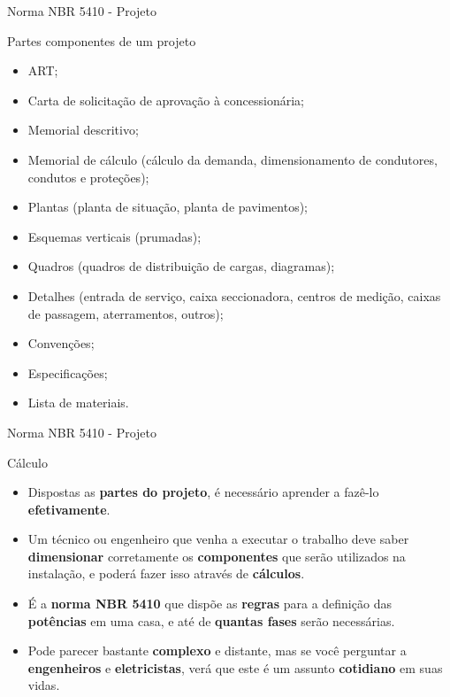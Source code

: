 \begin{frame}{Norma NBR 5410 - Projeto}
	\begin{block}{Partes componentes de um projeto}
		\begin{itemize}
			\item ART;
			\item Carta de solicitação de aprovação à concessionária;
			\item Memorial descritivo;
			\item Memorial de cálculo (cálculo da demanda, dimensionamento de condutores, condutos e proteções);
			\item Plantas (planta de situação, planta de pavimentos);
			\item Esquemas verticais (prumadas);
			\item Quadros (quadros de distribuição de cargas, diagramas);
			\item Detalhes (entrada de serviço, caixa seccionadora, centros de medição, caixas de passagem, aterramentos, outros);
			\item Convenções;
			\item Especificações;
			\item Lista de materiais.
		\end{itemize}
	\end{block}


\end{frame}


\begin{frame}{Norma NBR 5410 - Projeto}
	\begin{block}{Cálculo}
		\begin{itemize}
			\item Dispostas as \textbf{partes do projeto}, é necessário aprender a fazê-lo \textbf{efetivamente}.
			\item Um técnico ou engenheiro que venha a executar o trabalho deve saber \textbf{dimensionar} corretamente os \textbf{componentes} que serão utilizados na instalação, e poderá fazer isso através de \textbf{cálculos}.
			\item É a \textbf{norma NBR 5410} que dispõe as \textbf{regras} para a definição das \textbf{potências} em uma casa, e até de \textbf{quantas fases} serão necessárias.
			\item Pode parecer bastante \textbf{complexo} e distante, mas se você perguntar a \textbf{engenheiros} e \textbf{eletricistas}, verá que este é um assunto \textbf{cotidiano} em suas vidas.
		\end{itemize}
	\end{block}


\end{frame}



